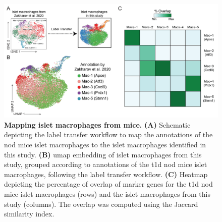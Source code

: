 \vspace{-20pt}
\begin{figure}[H]
\centering
\includegraphics[width=13cm]{Chapter4/Fig/F2-5-02.png}
\caption[Mapping islet macrophages from   mice]{\textbf{Mapping islet macrophages from   mice.} \textbf{(A)} Schematic depicting the label transfer workflow to map the annotations of the  \gls{nod} mice islet macrophages to the islet macrophages identified in this study. \textbf{(B)} \gls{umap} embedding of islet macrophages from this study, grouped according to annotations of the \gls{t1d} \gls{nod} mice islet macrophages, following the label transfer workflow. \textbf{(C)} Heatmap depicting the percentage of overlap of marker genes for the \gls{t1d} \gls{nod} mice islet macrophages (rows) and the islet macrophages from this study (columns). The overlap was computed using the Jaccard similarity index.}
\label{fig:chp2_scrna_macrophages_unanue}
\end{figure}

